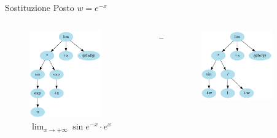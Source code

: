 \documentclass[aspectratio=149]{beamer}
\begin{document}
	\begin{frame}
		\begin{exampleblock}{Sostituzione}
			Posto \(w = e^{-x}\)
		\end{exampleblock}
		\begin{columns}
			\begin{column}{0.45\textwidth}
				\begin{figure}
					\includegraphics[width=0.8\textwidth]{pres_img/simplified2.png}
					\caption{\(\lim_{x \to +\infty}{\sin{e^{-x}} \cdot e^{x}}\)}
				\end{figure}
			\end{column}
			\begin{column}{0.1\textwidth}
				\begin{center}
					$\rightarrow$
				\end{center}
			\end{column}
			\begin{column}{0.45\textwidth}
				\begin{figure}
					\includegraphics[width=0.8\textwidth]{pres_img/rewritten.png}

\end{figure}
\end{column}
\end{columns}
\end{frame}
\end{document}
